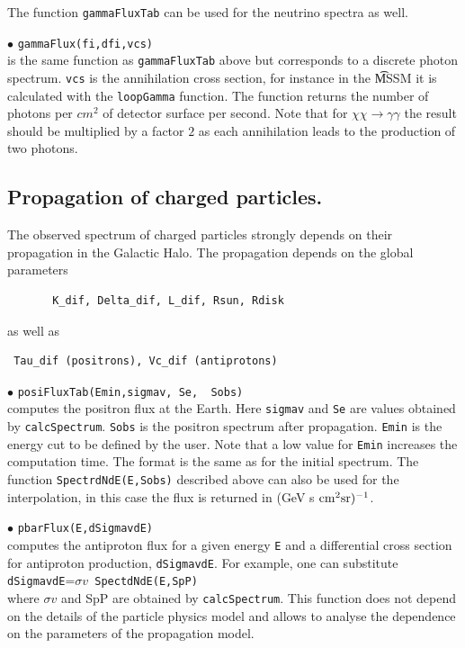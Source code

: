 \documentclass[12pt,a4paper]{article}
\begin{document}
The function \verb|gammaFluxTab| can be used  for the neutrino spectra as well.

\noindent
$\bullet$ \verb|gammaFlux(fi,dfi,vcs)|\\
is the same function as \verb|gammaFluxTab| above  but corresponds to  
a discrete photon spectrum. \verb|vcs| is the annihilation cross section, for instance in the {\t MSSM} it is 
calculated with the \verb|loopGamma| function. The function
returns the number of photons per $cm^2$ of detector surface
 per second. Note that for $\chi\chi \to \gamma\gamma$ the  
result should be multiplied by a factor $2$ as each annihilation leads to the 
production of two photons. 

\subsection{Propagation of charged particles.}

The observed spectrum of charged particles  strongly depends on their propagation
in the Galactic Halo. The propagation depends on the global parameters 
\begin{verbatim}
       K_dif, Delta_dif, L_dif, Rsun, Rdisk
\end{verbatim}
as well as 
\begin{verbatim}
 Tau_dif (positrons), Vc_dif (antiprotons)
\end{verbatim}

\noindent  
$\bullet$ \verb|posiFluxTab(Emin,sigmav, Se,  Sobs)|\\
computes the positron flux at the Earth. Here \verb|sigmav| and \verb|Se| are values obtained by 
\verb|calcSpectrum|.  \verb|Sobs| is the positron spectrum after propagation. \verb|Emin| is the energy cut to be defined by the user. Note that
a low value for \verb|Emin| increases the computation time.
The  format is the same as for the initial spectrum. The function  
\verb|SpectrdNdE(E,Sobs)| described above can also be used for the interpolation, in this case the flux is
returned in (GeV s ${\rm cm}^2 {\rm sr})^{-1}$. 

\noindent
$\bullet$ \verb|pbarFlux(E,dSigmavdE)|\\
computes the antiproton flux for a given energy {\tt E} and a 
differential cross section for antiproton production, {\tt dSigmavdE}.
For example, one can substitute\\ {\tt dSigmavdE}=$\sigma v${\tt
SpectdNdE(E,SpP)} \\
where $ \sigma v$ and {SpP} are obtained by {\tt calcSpectrum}.
This function does not depend on the details of the particle physics  model and allows to analyse the dependence on the
parameters of the propagation model.
\end{document}
